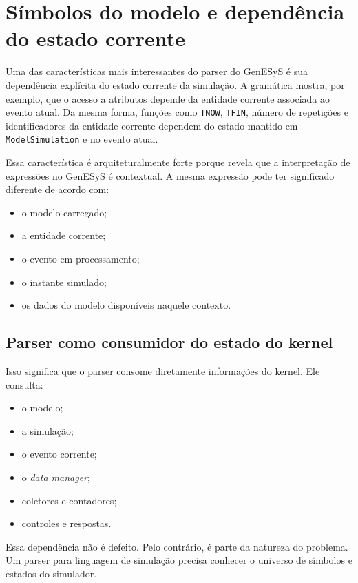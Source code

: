 \section{Símbolos do modelo e dependência do estado corrente}
\label{sec:cap9_simbolos_modelo_estado_corrente}

Uma das características mais interessantes do parser do GenESyS é sua dependência explícita do estado corrente da simulação. A gramática mostra, por exemplo, que o acesso a atributos depende da entidade corrente associada ao evento atual. Da mesma forma, funções como \texttt{TNOW}, \texttt{TFIN}, número de repetições e identificadores da entidade corrente dependem do estado mantido em \texttt{ModelSimulation} e no evento atual.

Essa característica é arquiteturalmente forte porque revela que a interpretação de expressões no GenESyS é contextual. A mesma expressão pode ter significado diferente de acordo com:
\begin{itemize}
    \item o modelo carregado;
    \item a entidade corrente;
    \item o evento em processamento;
    \item o instante simulado;
    \item os dados do modelo disponíveis naquele contexto.
\end{itemize}

\subsection{Parser como consumidor do estado do kernel}
\label{subsec:cap9_parser_consumidor_estado_kernel}

Isso significa que o parser consome diretamente informações do kernel. Ele consulta:
\begin{itemize}
    \item o modelo;
    \item a simulação;
    \item o evento corrente;
    \item o \textit{data manager};
    \item coletores e contadores;
    \item controles e respostas.
\end{itemize}

Essa dependência não é defeito. Pelo contrário, é parte da natureza do problema. Um parser para linguagem de simulação precisa conhecer o universo de símbolos e estados do simulador.

